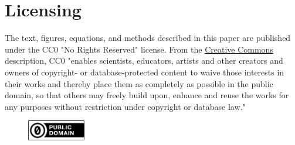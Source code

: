 \section{Licensing}
\label{sec:license}

The text, figures, equations, and methods described in this paper
are published under the CC0 "No Rights Reserved" license.
From the
\href{https://creativecommons.org/public-domain/cc0/}{Creative Commons} description,
CC0 "enables scientists, educators,
artists and other creators and owners of copyright- or database-protected
content to waive those interests in their works and thereby place them as
completely as possible in the public domain, so that others may freely
build upon, enhance and reuse the works for any purposes without restriction
under copyright or database law."

\begin{figure}[ht]
\vskip 0.2in
\begin{center}
\centerline{\includegraphics[width=1.0in]{images/cc-zero.png}}
\label{fig:cc0}
\end{center}
\vskip -0.2in
\end{figure}

